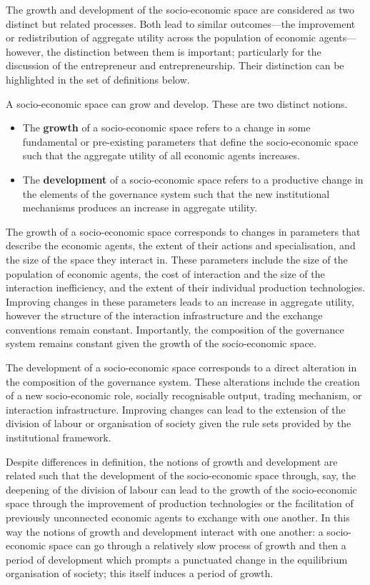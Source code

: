 The growth and development of the socio-economic space are considered as two distinct but related processes. Both lead to similar outcomes---the improvement or redistribution of aggregate utility across the population of economic agents---however, the distinction between them is important; particularly for the discussion of the entrepreneur and entrepreneurship. Their distinction can be highlighted in the set of definitions below.
\begin{definition} \label{def:growthanddevelopment}
A socio-economic space can grow and develop. These are two distinct notions.
\begin{itemize}
	\item The \textbf{growth} of a socio-economic space refers to a change in some fundamental or pre-existing parameters that define the socio-economic space such that the aggregate utility of all economic agents increases.

	\item The \textbf{development} of a socio-economic space refers to a productive change in the elements of the governance system such that the new institutional mechanisms produces an increase in aggregate utility.
\end{itemize}
\end{definition}
The growth of a socio-economic space corresponds to changes in parameters that describe the economic agents, the extent of their actions and specialisation, and the size of the space they interact in. These parameters include the size of the population of economic agents, the cost of interaction and the size of the interaction inefficiency, and the extent of their individual production technologies. Improving changes in these parameters leads to an increase in aggregate utility, however the structure of the interaction infrastructure and the exchange conventions remain constant. Importantly, the composition of the governance system remains constant given the growth of the socio-economic space.

The development of a socio-economic space corresponds to a direct alteration in the composition of the governance system. These alterations include the creation of a new socio-economic role, socially recognisable output, trading mechanism, or interaction infrastructure. Improving changes can lead to the extension of the division of labour or organisation of society given the rule sets provided by the institutional framework.

Despite differences in definition, the notions of growth and development are related such that the development of the socio-economic space through, say, the deepening of the division of labour can lead to the growth of the socio-economic space through the improvement of production technologies or the facilitation of previously unconnected economic agents to exchange with one another. In this way the notions of growth and development interact with one another: a socio-economic space can go through a relatively slow process of growth and then a period of development which prompts a punctuated change in the equilibrium organisation of society; this itself induces a period of growth.


